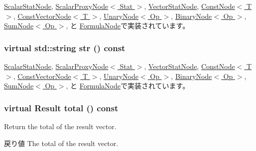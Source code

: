 \hyperlink{classStats_1_1ScalarStatNode_a503ab01f6c0142145d3434f6924714e7}{ScalarStatNode}, \hyperlink{classStats_1_1ScalarProxyNode_a503ab01f6c0142145d3434f6924714e7}{ScalarProxyNode$<$ Stat $>$}, \hyperlink{classStats_1_1VectorStatNode_a503ab01f6c0142145d3434f6924714e7}{VectorStatNode}, \hyperlink{classStats_1_1ConstNode_a503ab01f6c0142145d3434f6924714e7}{ConstNode$<$ T $>$}, \hyperlink{classStats_1_1ConstVectorNode_a503ab01f6c0142145d3434f6924714e7}{ConstVectorNode$<$ T $>$}, \hyperlink{classStats_1_1UnaryNode_a503ab01f6c0142145d3434f6924714e7}{UnaryNode$<$ Op $>$}, \hyperlink{classStats_1_1BinaryNode_a503ab01f6c0142145d3434f6924714e7}{BinaryNode$<$ Op $>$}, \hyperlink{classStats_1_1SumNode_a503ab01f6c0142145d3434f6924714e7}{SumNode$<$ Op $>$}, と \hyperlink{classStats_1_1FormulaNode_a503ab01f6c0142145d3434f6924714e7}{FormulaNode}で実装されています。\hypertarget{classStats_1_1Node_a6522bc65bd97a6b1ef6cdfe78462a919}{
\subsubsection[{str}]{\setlength{\rightskip}{0pt plus 5cm}virtual std::string str () const}}
\label{classStats_1_1Node_a6522bc65bd97a6b1ef6cdfe78462a919}


\hyperlink{classStats_1_1ScalarStatNode_a1b9b8885b0880fc4ddf9a2c7d1ca3dc4}{ScalarStatNode}, \hyperlink{classStats_1_1ScalarProxyNode_a1b9b8885b0880fc4ddf9a2c7d1ca3dc4}{ScalarProxyNode$<$ Stat $>$}, \hyperlink{classStats_1_1VectorStatNode_a1b9b8885b0880fc4ddf9a2c7d1ca3dc4}{VectorStatNode}, \hyperlink{classStats_1_1ConstNode_a1b9b8885b0880fc4ddf9a2c7d1ca3dc4}{ConstNode$<$ T $>$}, \hyperlink{classStats_1_1ConstVectorNode_a1b9b8885b0880fc4ddf9a2c7d1ca3dc4}{ConstVectorNode$<$ T $>$}, \hyperlink{classStats_1_1UnaryNode_a1b9b8885b0880fc4ddf9a2c7d1ca3dc4}{UnaryNode$<$ Op $>$}, \hyperlink{classStats_1_1BinaryNode_a1b9b8885b0880fc4ddf9a2c7d1ca3dc4}{BinaryNode$<$ Op $>$}, \hyperlink{classStats_1_1SumNode_a1b9b8885b0880fc4ddf9a2c7d1ca3dc4}{SumNode$<$ Op $>$}, と \hyperlink{classStats_1_1FormulaNode_a1b9b8885b0880fc4ddf9a2c7d1ca3dc4}{FormulaNode}で実装されています。\hypertarget{classStats_1_1Node_ab152b7e89b37a7db03b04d500ceb8349}{
\subsubsection[{total}]{\setlength{\rightskip}{0pt plus 5cm}virtual {\bf Result} total () const}}
\label{classStats_1_1Node_ab152b7e89b37a7db03b04d500ceb8349}
Return the total of the result vector. \begin{DoxyReturn}{戻り値}
The total of the result vector. 
\end{DoxyReturn}


